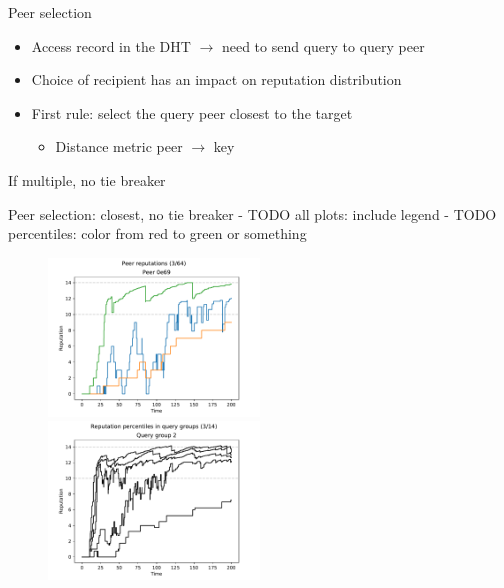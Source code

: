 \documentclass[presentation,english,usenames,dvipsnames]{beamer}
\begin{document}
\begin{frame}{Peer selection}
  \begin{itemize}
    \item Access record in the DHT $\rightarrow$ need to send query to query
    peer
    \item Choice of recipient has an impact on reputation distribution

    \pause

    \item First rule: select the query peer closest to the target
    \begin{itemize}
      \item Distance metric peer $\rightarrow$ key
    \end{itemize}
  \end{itemize}

    \pause

  \begin{block}{}
    If multiple, no tie breaker
  \end{block}
\end{frame}

\begin{frame}{Peer selection: closest, no tie breaker}
- TODO all plots: include legend
- TODO percentiles: color from red to green or something
  \begin{figure}
    \centering
    \includegraphics[width=0.5\textwidth]{figures/selection_overlap_peer_reps_3_of_64}\pause%
    \includegraphics[width=0.5\textwidth]{figures/selection_overlap_rep_percs_3_of_14}
  \end{figure}
\end{frame}
\end{document}

